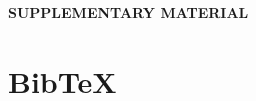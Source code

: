 \documentclass[12pt]{article}
\begin{document}
%
%
%
%
%				
%
%


%
			
	

\newpage
\begin{center}
{\large\bf SUPPLEMENTARY MATERIAL}
\end{center}


\section{BibTeX}

 
 		
\end{document}
